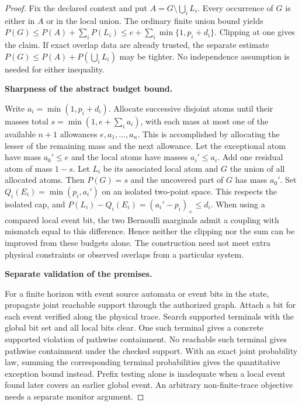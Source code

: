 \begin{proof}

Fix the declared context and put \(A=G\setminus\bigcup_iL_i\). Every occurrence of \(G\) is either in \(A\) or in the local union. The ordinary finite union bound yields
\(P(G)\le P(A)+\sum_iP(L_i)
          \le e+\sum_i \min\{1,p_i+d_i\}.\)
Clipping at one gives the claim. If exact overlap data are already trusted, the separate estimate \(P(G)\le P(A)+P(\bigcup_iL_i)\) may be tighter. No independence assumption is needed for either inequality.

\textbf{Sharpness of the abstract budget bound.}

Write \(a_i=\min(1,p_i+d_i)\). Allocate successive disjoint atoms until their masses total \(s=\min(1,e+\sum_i a_i)\), with each mass at most one of the available \(n+1\) allowances \(e,a_1,\ldots,a_n\). This is accomplished by allocating the lesser of the remaining mass and the next allowance. Let the exceptional atom have mass \(a_0'\le e\) and the local atoms have masses \(a_i'\le a_i\). Add one residual atom of mass \(1-s\). Let \(L_i\) be its associated local atom and \(G\) the union of all allocated atoms. Then \(P(G)=s\) and the uncovered part of \(G\) has mass \(a_0'\). Set \(Q_i(E_i)=\min(p_i,a_i')\) on an isolated two-point space. This respects the isolated cap, and \(P(L_i)-Q_i(E_i)=(a_i'-p_i)_+\le d_i\). When using a compared local event bit, the two Bernoulli marginals admit a coupling with mismatch equal to this difference. Hence neither the clipping nor the sum can be improved from these budgets alone. The construction need not meet extra physical constraints or observed overlaps from a particular system.

\textbf{Separate validation of the premises.}

For a finite horizon with event source automata or event bits in the state, propagate joint reachable support through the authorized graph. Attach a bit for each event verified along the physical trace. Search supported terminals with the global bit set and all local bits clear. One such terminal gives a concrete supported violation of pathwise containment. No reachable such terminal gives pathwise containment under the checked support. With an exact joint probability law, summing the corresponding terminal probabilities gives the quantitative exception bound instead. Prefix testing alone is inadequate when a local event found later covers an earlier global event. An arbitrary non-finite-trace objective needs a separate monitor argument.


\end{proof}
